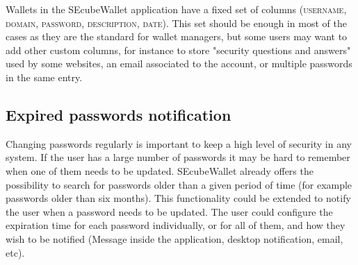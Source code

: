Wallets in the SEcubeWallet application have a fixed set of columns (\textsc{username}, \textsc{domain}, \textsc{password}, \textsc{description}, \textsc{date}). This set should be enough in most of the cases as they are the standard for wallet managers, but some users may want to add other custom columns, for instance to store "security questions and answers" used by some websites, an email associated to the account, or multiple passwords in the same entry.

\subsection{Expired passwords notification}

Changing passwords regularly is important to keep a high level of security in any system. If the user has a large number of passwords it may be hard to remember when one of them needs to be updated. SEcubeWallet already offers the possibility to search for passwords older than a given period of time (for example passwords older than six months). This functionality could be extended to notify the user when a password needs to be updated. The user could configure the expiration time for each password individually, or for all of them, and how they wish to be notified (Message inside the application, desktop notification, email, etc).